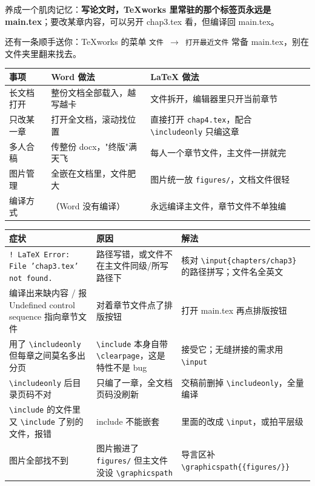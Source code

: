 养成一个肌肉记忆：\textbf{写论文时，TeXworks 里常驻的那个标签页永远是 main.tex}；要改某章内容，可以另开 chap3.tex 看，但编译回 main.tex。

还有一条顺手送你：TeXworks 的菜单 \texttt{文件 \ensuremath{\rightarrow} 打开最近文件} 常备 main.tex，别在文件夹里翻来找去。


\begin{table}[htbp]
\centering
\small
\begin{tabularx}{\linewidth}{@{}*{3}{>{\raggedright\arraybackslash}X}@{}}
\toprule
\textbf{事项} & \textbf{Word 做法} & \textbf{LaTeX 做法} \\
\midrule
长文档打开 & 整份文档全部载入，越写越卡 & 文件拆开，编辑器里只开当前章节 \\
只改某一章 & 打开全文档，滚动找位置 & 直接打开 \texttt{chap4.tex}，配合 \texttt{\textbackslash{}includeonly} 只编这章 \\
多人合稿 & 传整份 docx，"终版"满天飞 & 每人一个章节文件，主文件一拼就完 \\
图片管理 & 全嵌在文档里，文件肥大 & 图片统一放 \texttt{figures/}，文档文件很轻 \\
编译方式 & （Word 没有编译） & 永远编译主文件，章节文件不单独编 \\
\bottomrule
\end{tabularx}
\end{table}


\begin{table}[htbp]
\centering
\small
\begin{tabularx}{\linewidth}{@{}*{3}{>{\raggedright\arraybackslash}X}@{}}
\toprule
\textbf{症状} & \textbf{原因} & \textbf{解法} \\
\midrule
\texttt{! LaTeX Error: File 'chap3.tex' not found.} & 路径写错，或文件不在主文件同级/所写路径下 & 核对 \texttt{\textbackslash{}input\{chapters/chap3\}} 的路径拼写；文件名全英文 \\
编译出来缺内容 / 报 Undefined control sequence 指向章节文件 & 对着章节文件点了排版按钮 & 打开 main.tex 再点排版按钮 \\
用了 \texttt{\textbackslash{}includeonly} 但每章之间莫名多出分页 & \texttt{\textbackslash{}include} 本身自带 \texttt{\textbackslash{}clearpage}，这是特性不是 bug & 接受它；无缝拼接的需求用 \texttt{\textbackslash{}input} \\
\texttt{\textbackslash{}includeonly} 后目录页码不对 & 只编了一章，全文档页码没刷新 & 交稿前删掉 \texttt{\textbackslash{}includeonly}，全量编译 \\
\texttt{\textbackslash{}include} 的文件里又 \texttt{\textbackslash{}include} 了别的文件，报错 & include 不能嵌套 & 里面的改成 \texttt{\textbackslash{}input}，或拍平层级 \\
图片全部找不到 & 图片搬进了 \texttt{figures/} 但主文件没设 \texttt{\textbackslash{}graphicspath} & 导言区补 \texttt{\textbackslash{}graphicspath\{\{figures/\}\}} \\
\bottomrule
\end{tabularx}
\end{table}

